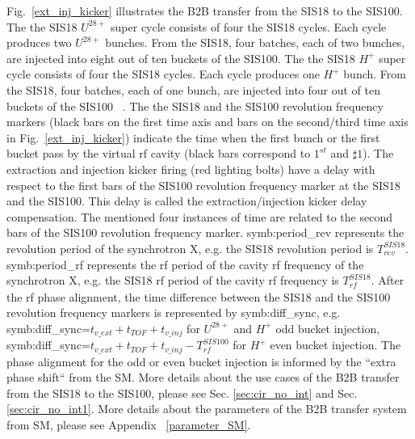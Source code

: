 Fig.~\ref{ext_inj_kicker} illustrates the B2B transfer from the SIS18 to the SIS100. The the SIS18 $U^{28+}$ super cycle consists of four the SIS18 cycles. Each cycle produces two $U^{28+}$ bunches. From the SIS18, four batches, each of two bunches, are injected into eight out of ten buckets of the SIS100. The the SIS18 $H^{+}$ super cycle consists of four the SIS18 cycles. Each cycle produces one $H^{+}$ bunch. From the SIS18, four batches, each of one bunch, are injected into four out of ten buckets of the SIS100 ~\cite{liebermann_fair_2013, liebermann_sis100_2013}. The the SIS18 and the SIS100 revolution frequency markers (black bars on the first time axis and bars on the second/third time axis in Fig.~\ref{ext_inj_kicker}) indicate the time when the first bunch or the first bucket pass by the virtual rf cavity (black bars correspond to $1^{st}$ and $\sharp1$). The extraction and injection kicker firing (red lighting bolts) have a delay with respect to the first bars of the SIS100 revolution frequency marker at the SIS18 and the SIS100. This delay is called the extraction/injection kicker delay compensation. The mentioned four instances of time are related to the second bars of the SIS100 revolution frequency marker. \gls{symb:period_rev} represents the revolution period of the synchrotron X, e.g. the SIS18 revolution period is $T_{\mathit{rev}}^{\mathit{SIS18}}$. \gls{symb:period_rf} represents the rf period of the cavity rf frequency of the synchrotron X, e.g. the SIS18 rf period of the cavity rf frequency is $T_{\mathit{rf}}^{\mathit{SIS18}}$. After the rf phase alignment, the time difference between the SIS18 and the SIS100 revolution frequency markers is represented by \gls{symb:diff_sync}, e.g. \gls{symb:diff_sync}=$t_{\mathit{v\_ext}}+t_{\mathit{TOF}}+t_{\mathit{v\_inj}}$ for $U^{28+}$ and $H^{+}$ odd bucket injection,  \gls{symb:diff_sync}=$t_{\mathit{v\_ext}}+t_{\mathit{TOF}}+t_{\mathit{v\_inj}}- T_{\mathit{rf}}^{\mathit{SIS100}}$ for $H^{+}$ even bucket injection. The phase alignment for the odd or even bucket injection is informed by the ``extra phase shift`` from the SM. More details about the use cases of the B2B transfer from the SIS18 to the SIS100, please see Sec. \ref{sec:cir_no_int} and Sec. \ref{sec:cir_no_int1}. More details about the parameters of the B2B transfer system from SM, please see Appendix ~\ref{parameter_SM}.  

